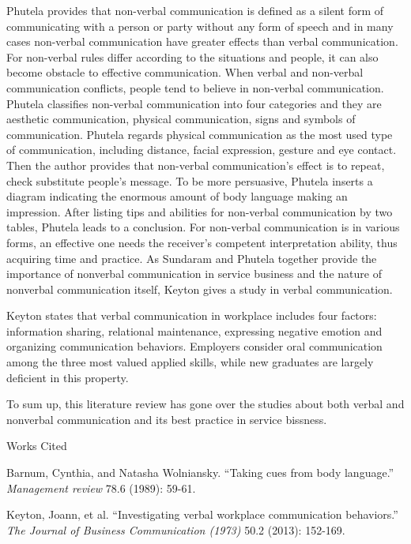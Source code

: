 \documentclass[12pt]{article}
\newcommand{\bibent}{\noindent \hangindent 40pt}
\newenvironment{workscited}{\newpage \begin{center} Works Cited \end{center}}{\newpage }
\begin{document}
\begin{flushleft}
Phutela provides that non-verbal communication is defined as a silent form of
communicating with a person or party without any form of speech and in many
cases non-verbal communication have greater effects than verbal communication.
For non-verbal rules differ according to the situations and people, it
can also become obstacle to effective communication.
When verbal and non-verbal communication conflicts, people tend to believe in
non-verbal communication.
Phutela classifies non-verbal communication into four categories and they are
aesthetic communication, physical communication, signs and symbols of
communication.
Phutela regards physical communication as the most used type of communication,
including distance, facial expression, gesture and eye contact.
Then the author provides that non-verbal communication’s effect is to repeat,
check substitute people’s message.
To be more persuasive, Phutela inserts a diagram indicating the enormous amount
of body language making an impression.
After listing tips and abilities for non-verbal communication by two tables,
Phutela leads to a conclusion.
For non-verbal communication is in various forms, an effective one needs the
receiver’s competent interpretation ability, thus acquiring time and practice.
As Sundaram and Phutela together provide the importance of nonverbal 
communication in service business and the nature of nonverbal communication
itself, Keyton gives a study in verbal communication.

Keyton states that verbal communication in workplace includes four factors:
information sharing, relational maintenance, expressing negative emotion and
organizing communication behaviors. Employers consider oral communication among
the three most valued applied skills, while new graduates are largely deficient
in this property.




To sum up, this literature review has gone over the studies about both verbal
and nonverbal communication and its best practice in service bissness. 
\newpage
\begin{workscited}


  
\bibent
Barnum, Cynthia, and Natasha Wolniansky. ``Taking cues from body language.'' \textit{Management review} 78.6 (1989): 59-61.

\bibent
Keyton, Joann, et al. ``Investigating verbal workplace communication
behaviors.'' \textit{The Journal of Business Communication (1973) } 50.2 (2013): 152-169. 


\end{workscited}
\end{flushleft}
\end{document}
